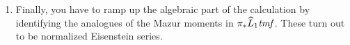 \begin{enumerate}
    \item Finally, you have to ramp up the algebraic part of the calculation by identifying the analogues of the Mazur moments in \(\pi_* \widehat L_1 \mathit{tmf}\).  These turn out to be normalized Eisenstein series.
\end{enumerate}









